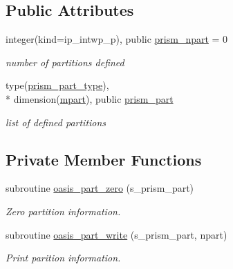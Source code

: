 \subsection*{Public Attributes}
\begin{DoxyCompactItemize}
\item 
integer(kind=ip\+\_\+intwp\+\_\+p), public \hyperlink{classmod__oasis__part_ac8340e63b159a9786ad8fffabd1d47f8}{prism\+\_\+npart} = 0
\begin{DoxyCompactList}\small\item\em number of partitions defined \end{DoxyCompactList}\item 
type(\hyperlink{structmod__oasis__part_1_1prism__part__type}{prism\+\_\+part\+\_\+type}), \\*
dimension(\hyperlink{classmod__oasis__part_ab68d087792db0351181c9a97025d793b}{mpart}), public \hyperlink{classmod__oasis__part_a326ce52f630ba7e71905af864a6cb2dc}{prism\+\_\+part}
\begin{DoxyCompactList}\small\item\em list of defined partitions \end{DoxyCompactList}\end{DoxyCompactItemize}
\subsection*{Private Member Functions}
\begin{DoxyCompactItemize}
\item 
subroutine \hyperlink{classmod__oasis__part_a17c747bc29d25b558df42524bd63ac90}{oasis\+\_\+part\+\_\+zero} (s\+\_\+prism\+\_\+part)
\begin{DoxyCompactList}\small\item\em Zero partition information. \end{DoxyCompactList}\item 
subroutine \hyperlink{classmod__oasis__part_a12edb4b0248a3f562fe5f6e16eede06a}{oasis\+\_\+part\+\_\+write} (s\+\_\+prism\+\_\+part, npart)
\begin{DoxyCompactList}\small\item\em Print parition information. \end{DoxyCompactList}\end{DoxyCompactItemize}
